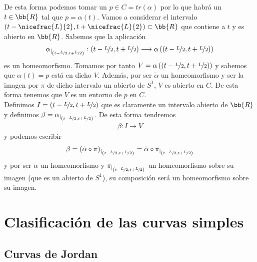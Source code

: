 \begin{ejemplo}
\begin{enumerate}
        De esta forma podemos tomar un $p\in C=tr(\alpha)$ por lo que habrá un $t\in \bb{R}$ tal que $p=\alpha(t)$. Vamos a considerar el intervalo $(t- \nicefrac{L}{2}, t+ \nicefrac{L}{2})\subset \bb{R}$ que contiene a $t$ y es abierto en $\bb{R}$. Sabemos que la aplicación
        \begin{gather*}
            \alpha_{|_{\left(t- \nicefrac{L}{2}, t+ \nicefrac{L}{2}\right)}} : \left(t- \nicefrac{L}{2}, t+ \nicefrac{L}{2}\right) \longrightarrow \alpha\left(\left(t- \nicefrac{L}{2}, t+ \nicefrac{L}{2}\right)\right)
        \end{gather*}
        es un homeomorfismo. Tomamos por tanto $V = \alpha\left(\left(t- \nicefrac{L}{2}, t+ \nicefrac{L}{2}\right)\right)$ y sabemos que $\alpha(t)=p$ está en dicho $V$. Además, por ser $\tilde{\alpha}$ un homeomorfismo y ser la imagen por $\pi$ de dicho intervalo un abierto de $S^1$, $V$ es abierto en $C$. De esta forma tenemos que $V$ es un entorno de $p$ en $C$.\\

        Definimos $I = \left(t- \nicefrac{L}{2}, t+ \nicefrac{L}{2}\right)$ que es claramente un intervalo abierto de $\bb{R}$ y definimos $\beta = \alpha_{|_{\left(t- \nicefrac{L}{2}, t+ \nicefrac{L}{2}\right)}}$. De esta forma tendremos
        \begin{gather*}
            \beta: I \longrightarrow V
        \end{gather*}
        y podemos escribir
        \begin{align*}
            \beta = (\tilde{\alpha}\circ \pi)_{|_{\left(t- \nicefrac{L}{2}, t+ \nicefrac{L}{2}\right)}}
            = \tilde{\alpha} \circ \pi_{|_{\left(t- \nicefrac{L}{2}, t+ \nicefrac{L}{2}\right)}}
        \end{align*}
        y por ser $\tilde{\alpha}$ un homeomorfismo y $\pi_{|_{\left(t- \nicefrac{L}{2}, t+ \nicefrac{L}{2}\right)}}$ un homeomorfismo sobre su imagen (que es un abierto de $S^1$), su composición será un homeomorfismo sobre su imagen.\\
    \end{enumerate}
\end{ejemplo}

\section{Clasificación de las curvas simples}

\subsection{Curvas de Jordan}

